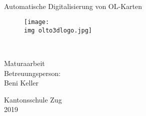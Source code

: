 \begin{titlepage}

\begin{center}

\vspace{40mm}

\huge{\textbf{\mytitle\\}}
\huge{Automatische Digitalisierung von OL-Karten\\}

\vspace{10mm}

\begin{figure}[hbt]
	\centering
	\texttt{[image: \\img olto3dlogo.jpg]}
\end{figure}

\vspace{10mm}

%

\Large{\textbf{\myauthor\\}}
\mydate

\vspace{15mm}

Maturaarbeit\\
Betreuungsperson:\\ 
Beni Keller

\vspace{15mm}
  
Kantonsschule Zug\\
2019


\end{center}

\end{titlepage}